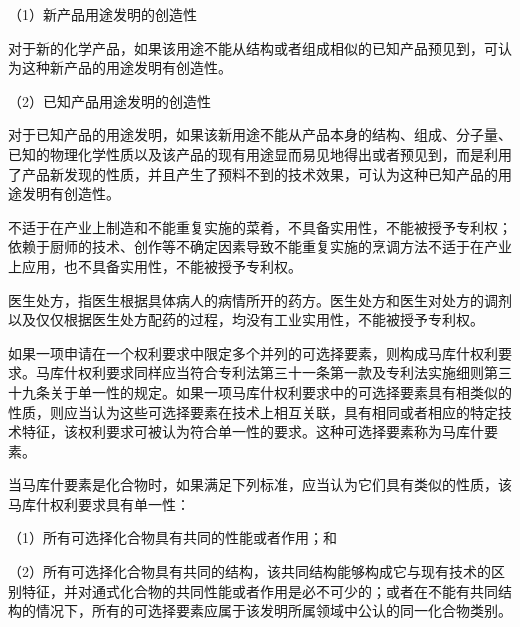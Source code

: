 {\setlength{\parindent}{17.1bp}（1）新产品用途发明的创造性\par}

对于新的化学产品，如果该用途不能从结构或者组成相似的已知产品预见到，可认为这种新产品的用途发明有创造性。

{\setlength{\parindent}{17.1bp}（2）已知产品用途发明的创造性\par}

对于已知产品的用途发明，如果该新用途不能从产品本身的结构、组成、分子量、已知的物理化学性质以及该产品的现有用途显而易见地得出或者预见到，而是利用了产品新发现的性质，并且产生了预料不到的技术效果，可认为这种已知产品的用途发明有创造性。

不适于在产业上制造和不能重复实施的菜肴，不具备实用性，不能被授予专利权；依赖于厨师的技术、创作等不确定因素导致不能重复实施的烹调方法不适于在产业上应用，也不具备实用性，不能被授予专利权。

医生处方，指医生根据具体病人的病情所开的药方。医生处方和医生对处方的调剂以及仅仅根据医生处方配药的过程，均没有工业实用性，不能被授予专利权。

如果一项申请在一个权利要求中限定多个并列的可选择要素，则构成马库什权利要求。马库什权利要求同样应当符合专利法第三十一条第一款及专利法实施细则第三十九条关于单一性的规定。如果一项马库什权利要求中的可选择要素具有相类似的性质，则应当认为这些可选择要素在技术上相互关联，具有相同或者相应的特定技术特征，该权利要求可被认为符合单一性的要求。这种可选择要素称为马库什要素。

当马库什要素是化合物时，如果满足下列标准，应当认为它们具有类似的性质，该马库什权利要求具有单一性：

{\setlength{\parindent}{17.1bp}（1）所有可选择化合物具有共同的性能或者作用；和\par}

{\setlength{\parindent}{17.1bp}（2）所有可选择化合物具有共同的结构，该共同结构能够构成它与现有技术的区别特征，并对通式化合物的共同性能或者作用是必不可少的；或者在不能有共同结构的情况下，所有的可选择要素应属于该发明所属领域中公认的同一化合物类别。\par}

